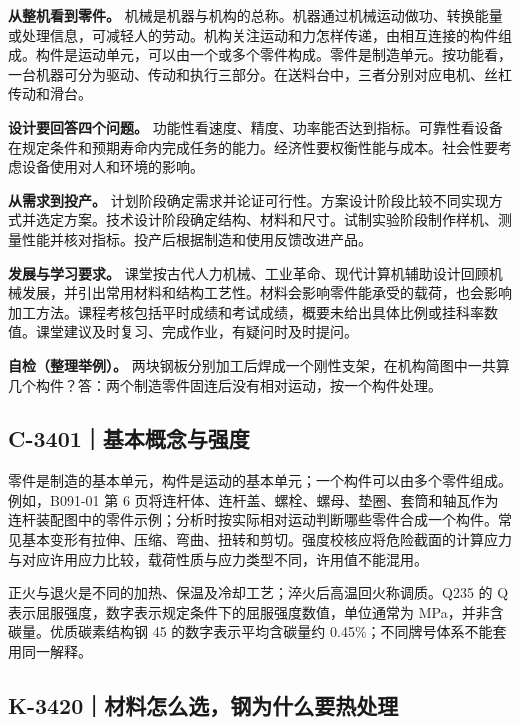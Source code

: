 \documentclass[zihao=5,a4paper,UTF8,fontset=fandol]{ctexart}
\begin{document}
\textbf{从整机看到零件。} 机械是机器与机构的总称。机器通过机械运动做功、转换能量或处理信息，可减轻人的劳动。机构关注运动和力怎样传递，由相互连接的构件组成。构件是运动单元，可以由一个或多个零件构成。零件是制造单元。按功能看，一台机器可分为驱动、传动和执行三部分。在送料台中，三者分别对应电机、丝杠传动和滑台。


\textbf{设计要回答四个问题。} 功能性看速度、精度、功率能否达到指标。可靠性看设备在规定条件和预期寿命内完成任务的能力。经济性要权衡性能与成本。社会性要考虑设备使用对人和环境的影响。


\textbf{从需求到投产。} 计划阶段确定需求并论证可行性。方案设计阶段比较不同实现方式并选定方案。技术设计阶段确定结构、材料和尺寸。试制实验阶段制作样机、测量性能并核对指标。投产后根据制造和使用反馈改进产品。


\textbf{发展与学习要求。} 课堂按古代人力机械、工业革命、现代计算机辅助设计回顾机械发展，并引出常用材料和结构工艺性。材料会影响零件能承受的载荷，也会影响加工方法。课程考核包括平时成绩和考试成绩，概要未给出具体比例或挂科率数值。课堂建议及时复习、完成作业，有疑问时及时提问。


\textbf{自检（整理举例）。} 两块钢板分别加工后焊成一个刚性支架，在机构简图中一共算几个构件？答：两个制造零件固连后没有相对运动，按一个构件处理。





\subsection{C-3401｜基本概念与强度}
\label{c-3401}

零件是制造的基本单元，构件是运动的基本单元；一个构件可以由多个零件组成。 例如，B091-01 第 6 页将连杆体、连杆盖、螺栓、螺母、垫圈、套筒和轴瓦作为连杆装配图中的零件示例；分析时按实际相对运动判断哪些零件合成一个构件。常见基本变形有拉伸、压缩、弯曲、扭转和剪切。强度校核应将危险截面的计算应力与对应许用应力比较，载荷性质与应力类型不同，许用值不能混用。


正火与退火是不同的加热、保温及冷却工艺；淬火后高温回火称调质。Q235 的 Q 表示屈服强度，数字表示规定条件下的屈服强度数值，单位通常为 MPa，并非含碳量。优质碳素结构钢 45 的数字表示平均含碳量约 0.45\%；不同牌号体系不能套用同一解释。





\subsection{K-3420｜材料怎么选，钢为什么要热处理}
\label{k-3420}
\end{document}

